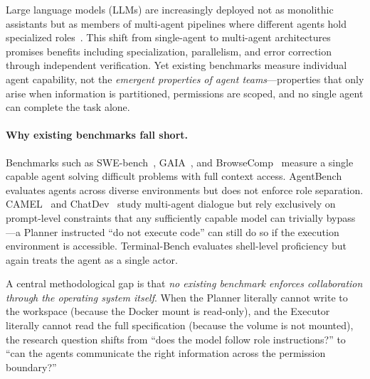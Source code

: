 \documentclass{article}
\begin{document}
Large language models (LLMs) are increasingly deployed not as monolithic
assistants but as members of multi-agent pipelines where different agents
hold specialized roles~\cite{wu2023autogen, hong2023metagpt, qian2023chatdev}.
This shift from single-agent to multi-agent architectures promises benefits
including specialization, parallelism, and error correction through independent
verification. Yet existing benchmarks measure individual agent capability, not
the \emph{emergent properties of agent teams}---properties that only arise
when information is partitioned, permissions are scoped, and no single agent
can complete the task alone.

\paragraph{Why existing benchmarks fall short.}
Benchmarks such as SWE-bench~\cite{jimenez2024swebench},
GAIA~\cite{mialon2023gaia}, and BrowseComp~\cite{browsecomp2024} measure a
single capable agent solving difficult problems with full context access.
AgentBench~\cite{liu2023agentbench} evaluates agents across diverse
environments but does not enforce role separation. CAMEL~\cite{li2023camel}
and ChatDev~\cite{qian2023chatdev} study multi-agent dialogue but rely
exclusively on prompt-level constraints that any sufficiently capable model
can trivially bypass---a Planner instructed ``do not execute code'' can still
do so if the execution environment is accessible. Terminal-Bench evaluates
shell-level proficiency but again treats the agent as a single actor.

A central methodological gap is that \emph{no existing benchmark enforces
collaboration through the operating system itself}. When the Planner literally
cannot write to the workspace (because the Docker mount is read-only), and
the Executor literally cannot read the full specification (because the volume
is not mounted), the research question shifts from ``does the model follow
role instructions?'' to ``can the agents communicate the right information
across the permission boundary?''
\end{document}
